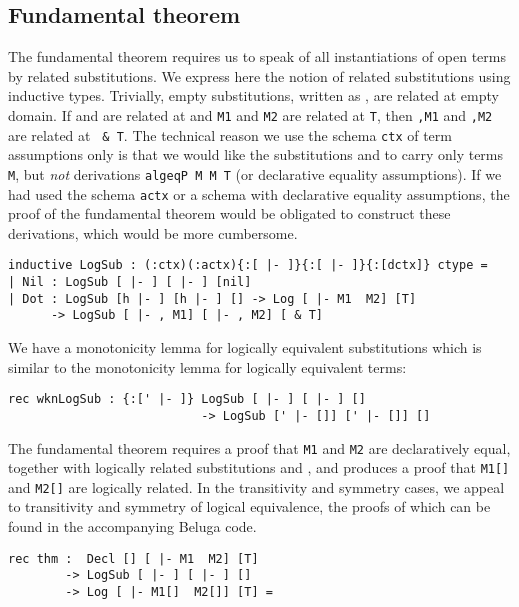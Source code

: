 \documentclass[copyright,creativecommons]{eptcs}
\begin{document}
\subsection{Fundamental theorem}

The fundamental theorem requires us to speak of all instantiations of
open terms by related substitutions. We express here the notion of
related substitutions using inductive types. Trivially, empty
substitutions, written as , are related at
empty domain. If  and  are related at
 and \lstinline{M1} and \lstinline{M2} are related at
\lstinline{T}, then \lstinline{,M1} and
\lstinline{,M2} are related at \lstinline{ & T}. The
technical reason we use the schema \lstinline{ctx} of term assumptions
only is that we would like the substitutions \lstinline{}
and \lstinline{} to carry only terms \lstinline{M}, but \emph{not}
derivations \lstinline{algeqP M M T} (or declarative equality
assumptions). If we had used the schema \lstinline{actx} or a schema
with declarative equality assumptions, the proof of the fundamental
theorem would be obligated to construct these derivations, which would
be more cumbersome.

\begin{lstlisting}
inductive LogSub : (:ctx)(:actx){:[ |- ]}{:[ |- ]}{:[dctx]} ctype =
| Nil : LogSub [ |- ] [ |- ] [nil]
| Dot : LogSub [h |- ] [h |- ] [] -> Log [ |- M1  M2] [T]
      -> LogSub [ |- , M1] [ |- , M2] [ & T] 
\end{lstlisting}

We have a monotonicity lemma for logically equivalent substitutions
which is similar to the monotonicity lemma for logically equivalent terms:

\begin{lstlisting}
rec wknLogSub : {:[' |- ]} LogSub [ |- ] [ |- ] []
                           -> LogSub [' |- []] [' |- []] []
\end{lstlisting}

The fundamental theorem requires a proof that \lstinline{M1} and
\lstinline{M2} are declaratively equal, together with logically
related substitutions  and , and produces a proof that
\lstinline{M1[]} and \lstinline{M2[]} are
logically related.  In the
transitivity and symmetry cases, we appeal to transitivity and symmetry
of logical equivalence, the proofs of which can be found in the
accompanying Beluga code.


\begin{lstlisting}
rec thm :  Decl [] [ |- M1  M2] [T]
        -> LogSub [ |- ] [ |- ] []
        -> Log [ |- M1[]  M2[]] [T] =
\end{lstlisting}
\end{document}
